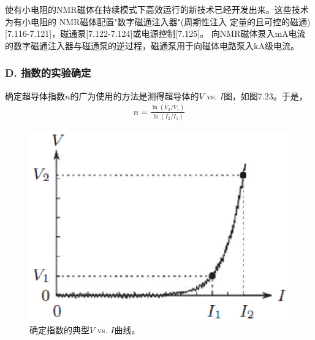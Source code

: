 使有小电阻的NMR磁体在持续模式下高效运行的新技术已经开发出来。这些技术为有小电阻的
NMR磁体配置"数字磁通注入器"(周期性注入
定量的且可控的磁通)[7.116-7.121]，磁通泵[7.122-7.124]或电源控制[7.125]。
向NMR磁体泵入mA电流的数字磁通注入器与磁通泵的逆过程，磁通泵用于向磁体电路泵入kA级电流。

\subsubsection*{D. 指数的实验确定}
确定超导体指数$n$的广为使用的方法是测得超导体的$V$ vs. $I$图，如图7.23。于是，
\begin{align*}%
n=\frac{\ln(V_2/V_1)}{\ln(I_2/I_1)} \tag{7.48}
\end{align*}

\begin{figure}[htbp]
	\centering
	\includegraphics[scale=0.8]{chpt7/figs/fig7.23.eps}
	\caption{确定指数的典型$V$ vs. $I$曲线。}
\end{figure}


